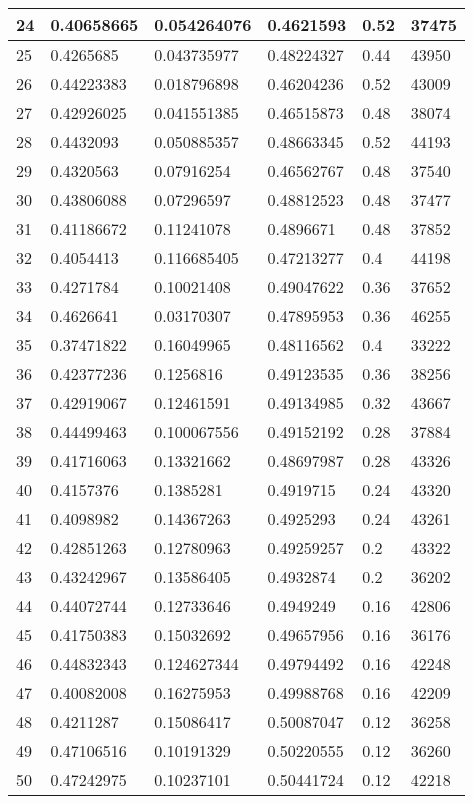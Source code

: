 \begin{longtable}{|l|l|l|l|l|l|}
24 & 0.40658665 & 0.054264076 & 0.4621593 & 0.52 & 37475 \\ \hline 
25 & 0.4265685 & 0.043735977 & 0.48224327 & 0.44 & 43950 \\ \hline 
26 & 0.44223383 & 0.018796898 & 0.46204236 & 0.52 & 43009 \\ \hline 
27 & 0.42926025 & 0.041551385 & 0.46515873 & 0.48 & 38074 \\ \hline 
28 & 0.4432093 & 0.050885357 & 0.48663345 & 0.52 & 44193 \\ \hline 
29 & 0.4320563 & 0.07916254 & 0.46562767 & 0.48 & 37540 \\ \hline 
30 & 0.43806088 & 0.07296597 & 0.48812523 & 0.48 & 37477 \\ \hline 
31 & 0.41186672 & 0.11241078 & 0.4896671 & 0.48 & 37852 \\ \hline 
32 & 0.4054413 & 0.116685405 & 0.47213277 & 0.4 & 44198 \\ \hline 
33 & 0.4271784 & 0.10021408 & 0.49047622 & 0.36 & 37652 \\ \hline 
34 & 0.4626641 & 0.03170307 & 0.47895953 & 0.36 & 46255 \\ \hline 
35 & 0.37471822 & 0.16049965 & 0.48116562 & 0.4 & 33222 \\ \hline 
36 & 0.42377236 & 0.1256816 & 0.49123535 & 0.36 & 38256 \\ \hline 
37 & 0.42919067 & 0.12461591 & 0.49134985 & 0.32 & 43667 \\ \hline 
38 & 0.44499463 & 0.100067556 & 0.49152192 & 0.28 & 37884 \\ \hline 
39 & 0.41716063 & 0.13321662 & 0.48697987 & 0.28 & 43326 \\ \hline 
40 & 0.4157376 & 0.1385281 & 0.4919715 & 0.24 & 43320 \\ \hline 
41 & 0.4098982 & 0.14367263 & 0.4925293 & 0.24 & 43261 \\ \hline 
42 & 0.42851263 & 0.12780963 & 0.49259257 & 0.2 & 43322 \\ \hline 
43 & 0.43242967 & 0.13586405 & 0.4932874 & 0.2 & 36202 \\ \hline 
44 & 0.44072744 & 0.12733646 & 0.4949249 & 0.16 & 42806 \\ \hline 
45 & 0.41750383 & 0.15032692 & 0.49657956 & 0.16 & 36176 \\ \hline 
46 & 0.44832343 & 0.124627344 & 0.49794492 & 0.16 & 42248 \\ \hline 
47 & 0.40082008 & 0.16275953 & 0.49988768 & 0.16 & 42209 \\ \hline 
48 & 0.4211287 & 0.15086417 & 0.50087047 & 0.12 & 36258 \\ \hline 
49 & 0.47106516 & 0.10191329 & 0.50220555 & 0.12 & 36260 \\ \hline 
50 & 0.47242975 & 0.10237101 & 0.50441724 & 0.12 & 42218 \\ \hline 
\end{longtable}